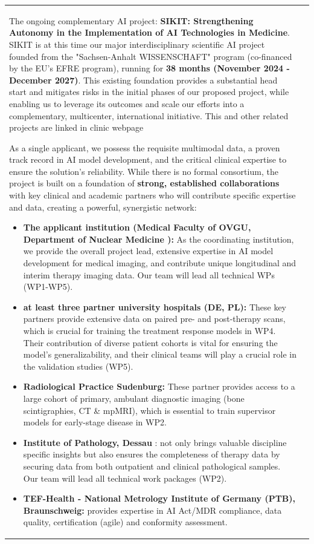 \documentclass[11pt, a4paper]{article}
\begin{document}
\begin{longtable}{| p{} | p{} |}
The ongoing complementary AI project: \textbf{SIKIT: Strengthening Autonomy in the Implementation of AI Technologies in Medicine}. SIKIT is at this time our major interdisciplinary scientific AI project founded from the "Sachsen-Anhalt WISSENSCHAFT" program (co-financed by the EU's EFRE program), running for \textbf{38 months (November 2024 - December 2027)}. This existing foundation provides a substantial head start and mitigates risks in the initial phases of our proposed project, while enabling us to leverage its outcomes  and scale our efforts into a complementary, multicenter, international initiative. This and other related projects are linked in clinic webpage \cite{ovguOVGUUniversitxE4tsklinikFxFCr}

As a single applicant, we possess the requisite multimodal data, a proven track record in AI model development, and the critical clinical expertise to ensure the solution's reliability. While there is no formal consortium, the project is built on a foundation of \textbf{strong, established collaborations} with key clinical and academic partners who will contribute specific expertise and data, creating a powerful, synergistic network:
\begin{itemize}
    \item \textbf{The applicant institution (Medical Faculty of OVGU, Department of Nuclear Medicine ):} As the coordinating institution, we provide the overall project lead, extensive expertise in AI model development for medical imaging, and contribute unique longitudinal and interim therapy imaging data. Our team will lead all technical WPs (WP1-WP5).
    \item \textbf{at least three partner university hospitals (DE, PL):} These key partners provide extensive data on paired pre- and post-therapy scans, which is crucial for training the treatment response models in WP4. Their contribution of diverse patient cohorts is vital for ensuring the model's generalizability, and their clinical teams will play a crucial role in the validation studies (WP5).
    \item \textbf{Radiological Practice Sudenburg:} These partner provides access to a large cohort of primary, ambulant diagnostic imaging (bone scintigraphies, CT \& mpMRI), which is essential to train supervisor models for early-stage disease in WP2.
    \item \textbf{Institute of Pathology, Dessau} : not only brings valuable discipline specific insights but also ensures the completeness of therapy data by securing data from both outpatient and clinical pathological samples. Our team will lead all technical work packages (WP2).  
    \item \textbf{TEF-Health - National Metrology Institute of Germany (PTB), Braunschweig: } provides expertise in AI Act/MDR compliance, data quality, certification (agile) and conformity assessment.\textbf{  }
\end{itemize}


\end{longtable}
\end{document}

